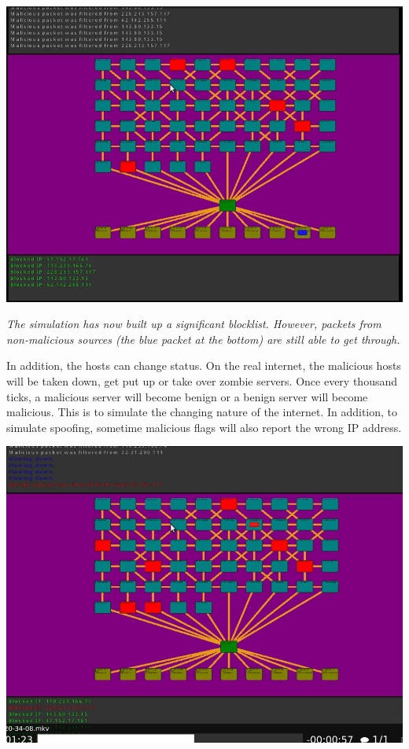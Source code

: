 \documentclass[12pt]{article}
\begin{document}
\begin{flushleft}
\begin{multicols}{2}
\includegraphics[scale=0.20]{screenshot5.png}

\textit{The simulation has now built up a significant blocklist. However, packets from non-malicious sources (the blue packet at the bottom) are still able to get through.}

In addition, the hosts can change status. On the real internet, the malicious hosts will be taken down, get put up or take over zombie servers. Once every thousand ticks, a malicious server will become benign or a benign server will become malicious. This is to simulate the changing nature of the internet. In addition, to simulate spoofing, sometime malicious flags will also report the wrong IP address.

\includegraphics[scale=0.20]{screenshot6.png}


\end{multicols}
\end{flushleft}
\end{document}
